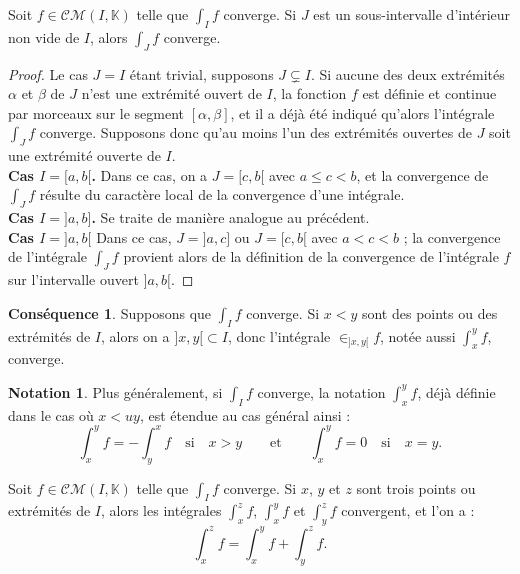 \documentclass[french]{article}
\newcommand{\K}{\mathbb{K}}
\theoremstyle{plain}
\theoremstyle{definition}
\newtheorem*{notation}{Notation}
\newtheorem*{conséquence}{Conséquence}
\theoremstyle{remark}
\begin{document}
\begin{prop}%
	Soit $f\in\mathcal{CM}(I,\K)$ telle que $\displaystyle\int_If$ converge. Si $J$ est un sous-intervalle d'intérieur non vide de $I$, alors $\displaystyle\int_Jf$ converge.
\end{prop}
\begin{proof}
	Le cas $J=I$ étant trivial, supposons $J\subsetneq I$.
	Si aucune des deux extrémités $\alpha$ et $\beta$ de $J$ n'est une extrémité ouvert de $I$, la fonction $f$ est définie et continue par morceaux sur le segment $[\alpha,\beta]$, et il a déjà été indiqué qu'alors l'intégrale $\displaystyle\int_Jf$ converge. Supposons donc qu'au moins l'un des extrémités ouvertes de $J$ soit une extrémité ouverte de $I$.\\
	\textbf{Cas $I=[a,b[$.} Dans ce cas, on a $J=[c,b[$ avec $a\leqslant c<b$, et la convergence de $\displaystyle\int_Jf$ résulte du caractère local de la convergence d'une intégrale.\\
	\textbf{Cas $I=]a,b]$.} Se traite de manière analogue au précédent.\\
	\textbf{Cas $I=]a,b[$} Dans ce cas, $J=]a,c]$ ou $J=[c,b[$ avec $a<c<b$ ; la convergence de l'intégrale $\displaystyle\int_Jf$ provient alors de la définition de la convergence de l'intégrale $f$ sur l'intervalle ouvert $]a,b[$.
\end{proof}

\begin{conséquence}
	Supposons que $\displaystyle\int_I f$ converge. Si $x<y$ sont des points ou des extrémités de $I$, alors on a $]x,y[\subset I$, donc l'intégrale $\displaystyle\in_{]x,y[}f$, notée aussi $\displaystyle\int_{x}^{y}f$, converge.
\end{conséquence}

\begin{notation}
	Plus généralement, si $\displaystyle\int_I f$ converge, la notation $\displaystyle\int_{x}^{y}f$, déjà définie dans le cas où $x<uy$, est étendue au cas général ainsi :
$$\int_{x}^{y}f=-\int_{y}^{x}f\quad\text{si}\quad x>y\quad\quad\text{et}\quad\quad\int_{x}^{y}f=0\quad\text{si}\quad x=y.$$
\end{notation}

\begin{prop}%
	Soit $f\in\mathcal{CM}(I,\K)$ telle que $\displaystyle\int_If$ converge. Si $x$, $y$ et $z$ sont trois points ou extrémités de $I$, alors les intégrales $\displaystyle\int_{x}^{z}f$, $\displaystyle\int_{x}^{y}f$ et $\displaystyle\int_{y}^{z}f$ convergent, et l'on a : 
	$$\int_{x}^{z}f=\int_{x}^{y}f+\int_{y}^{z}f.$$
\end{prop}
\end{document}
